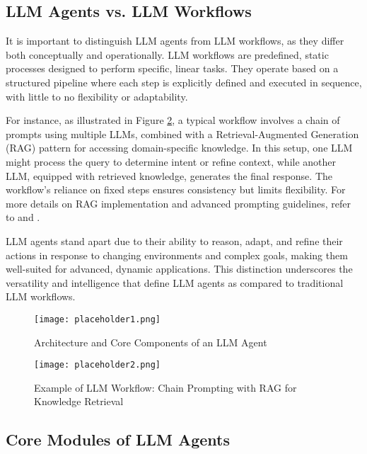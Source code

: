 \documentclass[12pt]{article}
\begin{document}
\subsection{LLM Agents vs. LLM Workflows}
It is important to distinguish LLM agents from LLM workflows, as they differ both conceptually and operationally. LLM workflows are predefined, static processes designed to perform specific, linear tasks. They operate based on a structured pipeline where each step is explicitly defined and executed in sequence, with little to no flexibility or adaptability.

For instance, as illustrated in Figure \ref{fig:workflow}, a typical workflow involves a chain of prompts using multiple LLMs, combined with a Retrieval-Augmented Generation (RAG) pattern for accessing domain-specific knowledge. In this setup, one LLM might process the query to determine intent or refine context, while another LLM, equipped with retrieved knowledge, generates the final response. The workflow’s reliance on fixed steps ensures consistency but limits flexibility. For more details on RAG implementation and advanced prompting guidelines, refer to \cite{giray2023prompt} and \cite{gao2023retrieval}.

LLM agents stand apart due to their ability to reason, adapt, and refine their actions in response to changing environments and complex goals, making them well-suited for advanced, dynamic applications. This distinction underscores the versatility and intelligence that define LLM agents as compared to traditional LLM workflows.




\begin{figure}[h!]
    \centering
    \texttt{[image: placeholder1.png]}
    \caption{Architecture and Core Components of an LLM Agent}
    \label{fig:architecture}
\end{figure}

\begin{figure}[h!]
    \centering
    \texttt{[image: placeholder2.png]}
    \caption{Example of LLM Workflow: Chain Prompting with RAG for Knowledge Retrieval}
    \label{fig:workflow}
\end{figure}

\newpage
\subsection{Core Modules of LLM Agents}
\end{document}
